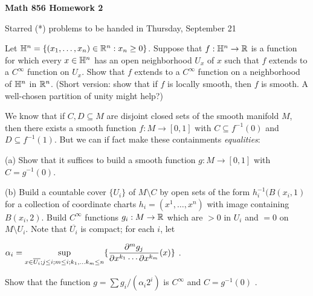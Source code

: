 
\nopagenumbers


\loadmsbm

\def\ctln{\centerline}
\def\ssk{\smallskip}
\def\msk{\medskip}
\def\bsk{\bigskip}
\def\nidt{\noindent}
\def\del{\partial}
\def\bbr{{\Bbb R}}

\def\ra{\rightarrow}
\def\lra{$\Leftrightarrow$}



\ctln{\bf Math 856 Homework 2}

\ssk

\ctln{Starred (*) problems to be handed in Thursday, September 21}

\bsk

\nidt {\bf (*) 9:} Let ${\Bbb H}^n=\{(x_1,\ldots,x_n)\in\bbr^n : x_n\geq 0\}$. Suppose that 
$f:{\Bbb H}^n\rightarrow \bbr$ is a function for which every $x\in {\Bbb H}^n$ has an open 
neighborhood $U_x$ of $x$ such that $f$ extends to a $C^\infty$ function on $U_x$. Show that $f$ extends
to a $C^\infty$ function on a neighborhood of ${\Bbb H}^n$ in $\bbr^n$. 
(Short version: show that if $f$ is locally smooth, then $f$ is smooth. A well-chosen partition
of unity might help?)

\msk

\nidt{\bf 10:} We know that if $C,D\subseteq M$ are disjoint closed sets of the smooth manifold $M$,
then there exists a smooth function $f:M\ra [0,1]$ with $C\subseteq f^{-1}(0)$ and $D\subseteq f^{-1}(1)$.
But we can if fact make these containments {\it equalities}:

\ssk

(a) Show that it suffices to build a smooth function $g:M\ra [0,1]$ with $C=g^{-1}(0)$.

\ssk

(b) Build a countable cover $\{U_i\}$ of $M\setminus C$ by open sets of the form $h_i^{-1}(B(x_i,1)$ for
a collection of coordinate charts $h_i=(x^1,\ldots,x^n)$ with image containing $B(x_i,2)$. Build $C^\infty$ functions $g_i:M\ra \bbr$ which are $>0$
in $U_i$ and $=0$ on $M\setminus U_i$. Note that $\overline{U_i}$ is compact; for each $i$, let

\ssk

\ctln{$\displaystyle \alpha_i = \sup_{x\in \overline{U_i};j\leq i;m\leq i;k_1,\ldots 
k_m\leq n}\{ {{\del^m g_j}\over{\del x^{k_1}\cdots \del x^{k_m}}}(x)\}$ .}

\ssk

\noindent Show that the function $g=\sum g_i/(\alpha_i 2^i)$ is $C^\infty$ and $C=g^{-1}(0)$ .

